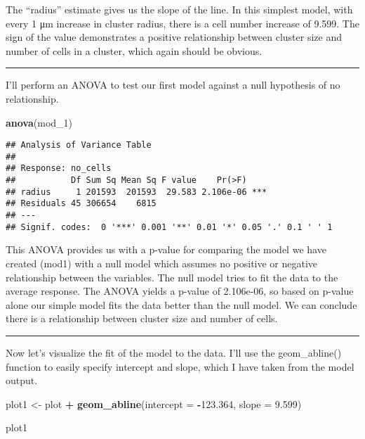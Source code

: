 \documentclass[]{article}
\newenvironment{Shaded}{\begin{snugshade}}{\end{snugshade}}
\newcommand{\KeywordTok}[1]{\textcolor[rgb]{0.13,0.29,0.53}{\textbf{#1}}}
\newcommand{\DataTypeTok}[1]{\textcolor[rgb]{0.13,0.29,0.53}{#1}}
\newcommand{\DecValTok}[1]{\textcolor[rgb]{0.00,0.00,0.81}{#1}}
\newcommand{\FloatTok}[1]{\textcolor[rgb]{0.00,0.00,0.81}{#1}}
\newcommand{\StringTok}[1]{\textcolor[rgb]{0.31,0.60,0.02}{#1}}
\newcommand{\OperatorTok}[1]{\textcolor[rgb]{0.81,0.36,0.00}{\textbf{#1}}}
\newcommand{\NormalTok}[1]{#1}
\begin{document}
The ``radius'' estimate gives us the slope of the line. In this simplest
model, with every 1 μm increase in cluster radius, there is a cell
number increase of 9.599. The sign of the value demonstrates a positive
relationship between cluster size and number of cells in a cluster,
which again should be obvious.

\begin{center}\rule{0.5\linewidth}{\linethickness}\end{center}

I'll perform an ANOVA to test our first model against a null hypothesis
of no relationship.

\begin{Shaded}
\begin{Highlighting}[]
\KeywordTok{anova}\NormalTok{(mod_}\DecValTok{1}\NormalTok{)}
\end{Highlighting}
\end{Shaded}

\begin{verbatim}
## Analysis of Variance Table
## 
## Response: no_cells
##           Df Sum Sq Mean Sq F value    Pr(>F)    
## radius     1 201593  201593  29.583 2.106e-06 ***
## Residuals 45 306654    6815                      
## ---
## Signif. codes:  0 '***' 0.001 '**' 0.01 '*' 0.05 '.' 0.1 ' ' 1
\end{verbatim}

This ANOVA provides us with a p-value for comparing the model we have
created (mod1) with a null model which assumes no positive or negative
relationship between the variables. The null model tries to fit the data
to the average response. The ANOVA yields a p-value of 2.106e-06, so
based on p-value alone our simple model fits the data better than the
null model. We can conclude there is a relationship between cluster size
and number of cells.

\begin{center}\rule{0.5\linewidth}{\linethickness}\end{center}

Now let's visualize the fit of the model to the data. I'll use the
geom\_abline() function to easily specify intercept and slope, which I
have taken from the model output.

\begin{Shaded}
\begin{Highlighting}[]
\NormalTok{plot1 <-}\StringTok{ }\NormalTok{plot }\OperatorTok{+}\StringTok{ }
\StringTok{  }\KeywordTok{geom_abline}\NormalTok{(}\DataTypeTok{intercept =} \OperatorTok{-}\FloatTok{123.364}\NormalTok{, }\DataTypeTok{slope =} \FloatTok{9.599}\NormalTok{)}

\NormalTok{plot1}
\end{Highlighting}
\end{Shaded}
\end{document}
